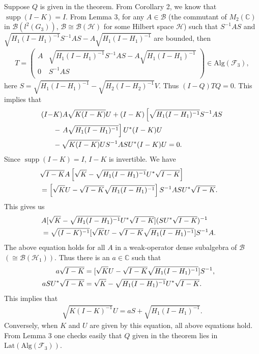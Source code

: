 \documentclass{pnastwo}
\newenvironment{proof}[1][Proof]{\begin{trivlist}
\item[\hskip \labelsep {\bfseries #1}]}{\end{trivlist}}
\newcommand{\B}{\mathcal B}
\newcommand{\F}{\mathcal F}
\newcommand{\HHH}{\mathcal H} %
\newcommand{\supp}{\mathop{\mathrm supp}}
\newcommand{\Lat}{\mathrm{Lat}}
\newcommand{\Alg}{\mathrm{Alg}}
\newcommand{\C}{\mathbb C} %
\begin{document}
\begin{article}
\begin{proof}
Suppose $Q$ is given
 in the theorem. From Corollary 2, we know that
 $\supp(I-K) =I$. From Lemma 3,
for any  $A\in\B$ (the commutant of $M_2(\C)$ in $\B(l^2(G_3))$,
$\B\cong\B(\HHH)$ for some Hilbert space $\HHH$) such that $S^{-1}AS$
and $\sqrt{H_{1}(I-H_{1})^{-1}}S^{-1}AS -
A\sqrt{H_{1}(I-H_{1})^{-1}}$ are bounded, then
\begin{align*}
T =\left(
     \begin{array}{cc}
       A & \sqrt{H_{1}(I-H_{1})^{-1}}S^{-1}AS - A\sqrt{H_{1}(I-H_{1})^{-1}} \\
       0 & S^{-1}AS \\
     \end{array}
   \right) \in \Alg(\F_3),
\end{align*}
here $S=\sqrt{H_{1}(I-H_{1})^{-1}} - \sqrt{H_{2}(I-H_{2})^{-1}}V$.
Thus $(I-Q)TQ=0$. This implies that
\begin{align*}
(I-&K)A\sqrt{K(I-K)}U +
(I-K)\left[\sqrt{H_{1}(I-H_{1})^{-1}}S^{-1}AS \right.\cr & -
\left.A\sqrt{H_{1}(I-H_{1})^{-1}}\right]U^{*}(I-K)U \\ &-
\sqrt{K(I-K)}US^{-1}ASU^{*}(I-K)U = 0.
\end{align*}
Since $\supp(I-K) = I$, $I-K$ is invertible. We have
\begin{align*}
&\sqrt{I-K}A\left[\sqrt{K} -
\sqrt{H_{1}(I-H_{1})^{-1}}U^{*}\sqrt{I-K}\right]\cr &=
\left[\sqrt{K}U -
\sqrt{I-K}\sqrt{H_{1}(I-H_{1})^{-1}}\right]S^{-1}ASU^{*}\sqrt{I-K}.
\end{align*}
This gives us
\begin{align*}
&A[\sqrt{K} -
\sqrt{H_{1}(I-H_{1})^{-1}}U^{*}\sqrt{I-K}](SU^{*}\sqrt{I-K})^{-1}\cr
&= \sqrt{(I-K)^{-1}}[\sqrt{K}U -
\sqrt{I-K}\sqrt{H_{1}(I-H_{1})^{-1}}]S^{-1}A.
\end{align*}
The above equation holds for all $A$ in a weak-operator dense
subalgebra of $\B$ $(\cong \B(\HHH_1))$. Thus there is an $a \in \C$
such that
\begin{align*}
a\sqrt{I-K} &= [\sqrt{K}U -
            \sqrt{I-K}\sqrt{H_{1}(I-H_{1})^{-1}}]S^{-1},\cr
aSU^*\sqrt{I-K}&= \sqrt{K} -
\sqrt{H_{1}(I-H_{1})^{-1}}U^{*}\sqrt{I-K}.
\end{align*}
This implies that
\begin{align*}
\sqrt{K(I-K)^{-1}}U = aS+ \sqrt{H_{1}(I-H_{1})^{-1}}.
\end{align*}
Conversely, when $K$ and $U$ are given by this equation, all above
equations hold. From Lemma 3 one checks easily that $Q$ given in
the theorem lies in $\Lat(\Alg(\F_3))$.
\end{proof}


\end{article}
\end{document}
